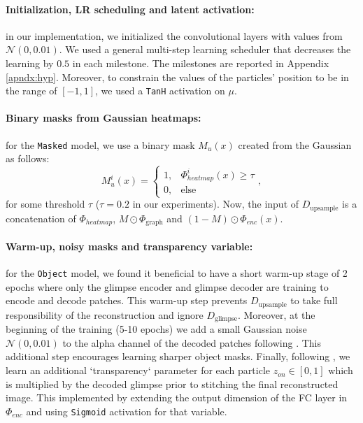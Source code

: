 \documentclass[nohyperref]{article}
\theoremstyle{plain}
\theoremstyle{definition}
\theoremstyle{remark}
\newcommand{\dgraph}{\Phi_{\textrm{graph}}}
\newcommand{\dglimpse}{D_{\textrm{glimpse}}}
\newcommand{\dupsample}{D_{\textrm{upsample}}}
\begin{document}
\paragraph{Initialization, LR scheduling and latent activation:} in our implementation, we initialized the convolutional layers with values from $\mathcal{N}(0, 0.01)$. We used a general multi-step learning scheduler that decreases the learning by $0.5$ in each milestone. The milestones are reported in Appendix \ref{apndx:hyp}. Moreover, to constrain the values of the particles' position to be in the range of $[-1, 1]$, we used a \texttt{TanH} activation on $\mu$.

\paragraph{Binary masks from Gaussian heatmaps:} for the \texttt{Masked} model, we use a binary mask $M_u(x)$ created from the Gaussian as follows: $$M_u^i(x) = \begin{cases} 1, & \Phi_{heatmap}^i(x) \geq \tau \\ 0, & \text{else} \end{cases},$$ for some threshold $\tau$ ($\tau = 0.2$ in our experiments). Now, the input of $\dupsample$ is a concatenation of $\Phi_{heatmap}$, $M \odot \dgraph$ and $(1 - M) \odot \Phi_{enc}(x)$.

\paragraph{Warm-up, noisy masks and transparency variable:} for the \texttt{Object} model, we found it beneficial to have a short warm-up stage of 2 epochs where only the glimpse encoder and glimpse decoder are training to encode and decode patches. This warm-up step prevents $\dupsample$ to take full responsibility of the reconstruction and ignore $\dglimpse$. Moreover, at the beginning of the training (5-10 epochs) we add a small Gaussian noise $\mathcal{N}(0, 0.01)$ to the alpha channel of the decoded patches following \citet{smirnov2021marionette}. This additional step encourages learning sharper object masks. Finally, following \citet{smirnov2021marionette}, we learn an additional `transparency` parameter for each particle $z_{on}\in [0, 1]$ which is multiplied by the decoded glimpse prior to stitching the final reconstructed image. This implemented by extending the output dimension of the FC layer in $\Phi_{enc}$ and using \texttt{Sigmoid} activation for that variable.
\end{document}
